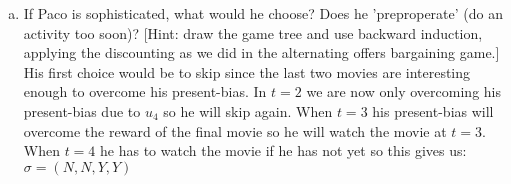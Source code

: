 \documentclass{article}
\begin{document}
\begin{itemize}
\begin{enumerate}[(a)]
\item If Paco is sophisticated, what would he choose?
Does he 'preproperate' (do an activity too soon)?
[Hint: draw the game tree and use backward induction, applying the discounting as we did in the alternating offers bargaining game.]
\newline
His first choice would be to skip since the last two movies are interesting enough to overcome his present-bias.
In $t=2$ we are now only overcoming his present-bias due to $u_4$ so he will skip again.
When $t=3$ his present-bias will overcome the reward of the final movie so he will watch the movie at $t=3$.
When $t=4$ he has to watch the movie if he has not yet so this gives us:
\newline
$\sigma = (N,N,Y,Y) $
\end{enumerate}
\end{itemize}
\end{document}
